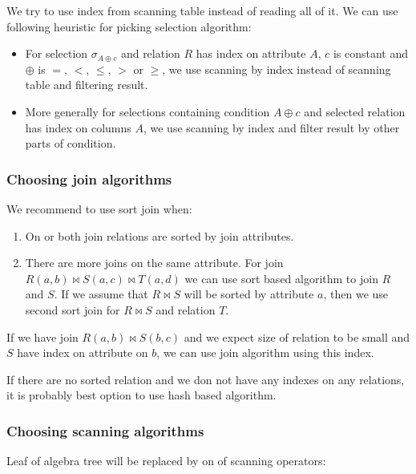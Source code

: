 We try to use index from scanning table instead of reading all of it. We can use following heuristic for picking selection algorithm: 
\begin{itemize}
\item For selection $\sigma_{A\oplus c}$ and relation $R$ has index on attribute $A$, $c$ is constant and $\oplus$ is $=$, $<$, $\leq$, $>$ or $\geq$, we use scanning by index instead of scanning table and filtering result.
\item More generally for selections containing condition $A\oplus c$ and selected relation has index on columns $A$, we use scanning by index and filter result by other parts of condition.
\end{itemize}

\subsubsection{Choosing join algorithms}

We recommend to use sort join when:

\begin{enumerate}
\item On or both join relations are sorted by join attributes.
\item There are more joins on the same attribute. For join $R(a,b)\Join S(a,c) \Join T(a,d)$ we can use  sort based algorithm to join $R$ and $S$. If we assume that $R \Join S$ will be sorted by attribute $a$, then we use second sort join for $R\Join S$ and relation $T$.

\end{enumerate}

If we have join $R(a,b)\Join S(b,c)$ and we expect size of relation to be small and $S$ have index on attribute on $b$, we can use join algorithm using this index.

If there are no sorted relation and we don not have any indexes on any relations, it is probably best option to use hash based algorithm.

\subsubsection{Choosing scanning algorithms}

Leaf of algebra tree will be replaced by on of scanning operators:

